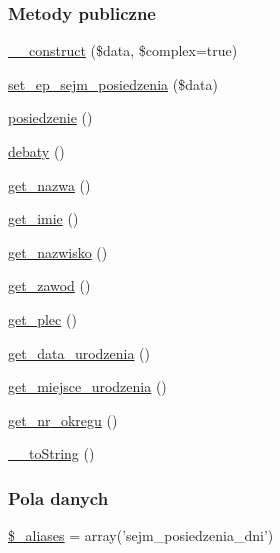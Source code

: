 \subsubsection*{Metody publiczne}
\begin{DoxyCompactItemize}
\item 
\hyperlink{classep___sejm___dzien_a8c384d5e0f13f64cbf8c51096faa7738}{\-\_\-\-\_\-construct} (\$data, \$complex=true)
\item 
\hyperlink{classep___sejm___dzien_a1ebe2368dbaefa70f34cea7885c4cbdd}{set\-\_\-ep\-\_\-sejm\-\_\-posiedzenia} (\$data)
\item 
\hyperlink{classep___sejm___dzien_abfdc29f0533665ad6c77341c5fa3f7c7}{posiedzenie} ()
\item 
\hyperlink{classep___sejm___dzien_a61f284b69abf1b9994fb0531fd5072ec}{debaty} ()
\item 
\hyperlink{classep___sejm___dzien_ac0818f0049d7b84f08f77128f54cee36}{get\-\_\-nazwa} ()
\item 
\hyperlink{classep___sejm___dzien_ac4b0c85dc2a130038f2d118dbd0c3d77}{get\-\_\-imie} ()
\item 
\hyperlink{classep___sejm___dzien_abdd1d7ff92508da7f748ba1feec97af0}{get\-\_\-nazwisko} ()
\item 
\hyperlink{classep___sejm___dzien_af80ca8310b60004454dd02a387deaa2c}{get\-\_\-zawod} ()
\item 
\hyperlink{classep___sejm___dzien_ac7f9af5c3fa024e4c26a7b6bd4ce4bb4}{get\-\_\-plec} ()
\item 
\hyperlink{classep___sejm___dzien_a880b240cd2d8c336fd1709bf0cb1ae2c}{get\-\_\-data\-\_\-urodzenia} ()
\item 
\hyperlink{classep___sejm___dzien_ac57c08ec5e394a19c5bd9280c8376182}{get\-\_\-miejsce\-\_\-urodzenia} ()
\item 
\hyperlink{classep___sejm___dzien_a2645a9f0aa5b0ccc482943348c033d0a}{get\-\_\-nr\-\_\-okregu} ()
\item 
\hyperlink{classep___sejm___dzien_a7516ca30af0db3cdbf9a7739b48ce91d}{\-\_\-\-\_\-to\-String} ()
\end{DoxyCompactItemize}
\subsubsection*{Pola danych}
\begin{DoxyCompactItemize}
\item 
\hyperlink{classep___sejm___dzien_ab4e31d75f0bc5d512456911e5d01366b}{\$\-\_\-aliases} = array('sejm\-\_\-posiedzenia\-\_\-dni')
\end{DoxyCompactItemize}

